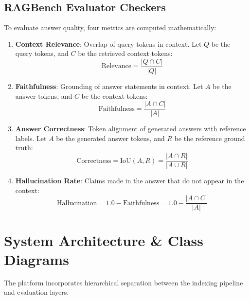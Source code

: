 \documentclass[11pt,journal,onecolumn]{IEEEtran}
\begin{document}
\subsection{RAGBench Evaluator Checkers}
To evaluate answer quality, four metrics are computed mathematically:
\begin{enumerate}
    \item \textbf{Context Relevance}: Overlap of query tokens in context. Let $Q$ be the query tokens, and $C$ be the retrieved context tokens:
    \begin{equation}
    \text{Relevance} = \frac{|Q \cap C|}{|Q|}
    \end{equation}
    \item \textbf{Faithfulness}: Grounding of answer statements in context. Let $A$ be the answer tokens, and $C$ be the context tokens:
    \begin{equation}
    \text{Faithfulness} = \frac{|A \cap C|}{|A|}
    \end{equation}
    \item \textbf{Answer Correctness}: Token alignment of generated answers with reference labels. Let $A$ be the generated answer tokens, and $R$ be the reference ground truth:
    \begin{equation}
    \text{Correctness} = \text{IoU}(A, R) = \frac{|A \cap R|}{|A \cup R|}
    \end{equation}
    \item \textbf{Hallucination Rate}: Claims made in the answer that do not appear in the context:
    \begin{equation}
    \text{Hallucination} = 1.0 - \text{Faithfulness} = 1.0 - \frac{|A \cap C|}{|A|}
    \end{equation}
\end{enumerate}

\section{System Architecture \& Class Diagrams}
The platform incorporates hierarchical separation between the indexing pipeline and evaluation layers.
\end{document}
